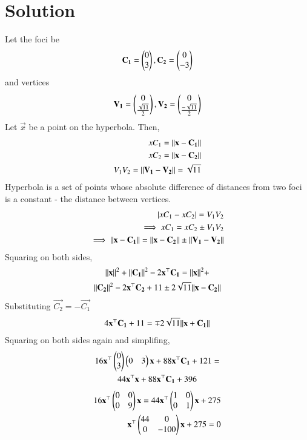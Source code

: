 \documentclass[journal,12pt,twocolumn]{IEEEtran}
\begin{document}
\section{Solution}
Let the foci be 
\begin{align}
     \mathbf{C_1} =\begin{pmatrix}0\\ 3\end{pmatrix},    \mathbf{C_2} = \begin{pmatrix}0\\- 3\end{pmatrix}
\end{align}
and vertices
\begin{align}
     \mathbf{V_1} =\begin{pmatrix}0\\ \frac{\sqrt{11}}{2}\end{pmatrix}, \mathbf{V_2} = \begin{pmatrix}0\\ \frac{-\sqrt{11}}{2}\end{pmatrix}
\end{align}
Let $\vec{x}$ be a point on the hyperbola. Then,
\begin{align}
    xC_1 = \lVert\mathbf{x} - \mathbf{C_1}\rVert\\
    xC_2 = \lVert\mathbf{x} - \mathbf{C_2}\rVert\\
    V_1V_2 = \lVert\mathbf{V_1} - \mathbf{V_2}\rVert = \sqrt{11}
\end{align}
Hyperbola is a set of points whose absolute difference of distances from two foci is a constant - the distance between vertices.
\begin{align}
    |xC_1 - xC_2| = V_1V_2\\
    \implies xC_1 = xC_2 \pm V_1V_2\\
    \implies \lVert\mathbf{x} - \mathbf{C_1}\rVert = \lVert\mathbf{x} - \mathbf{C_2}\rVert \pm \lVert\mathbf{V_1} - \mathbf{V_2}\rVert
\end{align}
Squaring on both sides,
\begin{multline}
    \lVert\mathbf{x}\rVert^2+\lVert\mathbf{C_1}\rVert^2-2\mathbf{x}^\top \mathbf{C_1} = \lVert\mathbf{x}\rVert^2+\\\lVert\mathbf{C_2}\rVert^2-2\mathbf{x}^\top \mathbf{C_2} + 11 \pm 2\sqrt{11} \lVert\mathbf{x} - \mathbf{C_2}\rVert
\end{multline}    
Substituting $\vec{C_2} = - \vec{C_1}$
\begin{align}
    4\mathbf{x}^\top \mathbf{C_1} + 11 = \mp 2\sqrt{11}\lVert\mathbf{x} + \mathbf{C_1}\rVert
\end{align}
Squaring on both sides again and simplifing,
\begin{multline}
     16\mathbf{x}^\top \begin{pmatrix}0\\3\end{pmatrix}\begin{pmatrix}0&3\end{pmatrix}\mathbf{x} + 88\mathbf{x}^\top\mathbf{C_1} + 121 =\\ 44\mathbf{x}^\top\mathbf{x} + 88\mathbf{x}^\top\mathbf{C_1} + 396
\end{multline}
\begin{align}
    16\mathbf{x}^\top\begin{pmatrix}0&0\\0&9\end{pmatrix}\mathbf{x} = 44\mathbf{x}^\top\begin{pmatrix}1&0\\0&1\end{pmatrix}\mathbf{x} + 275\\
    \mathbf{x}^\top\begin{pmatrix}44&0\\0&-100\end{pmatrix}\mathbf{x} + 275 = 0
\end{align}
\end{document}
